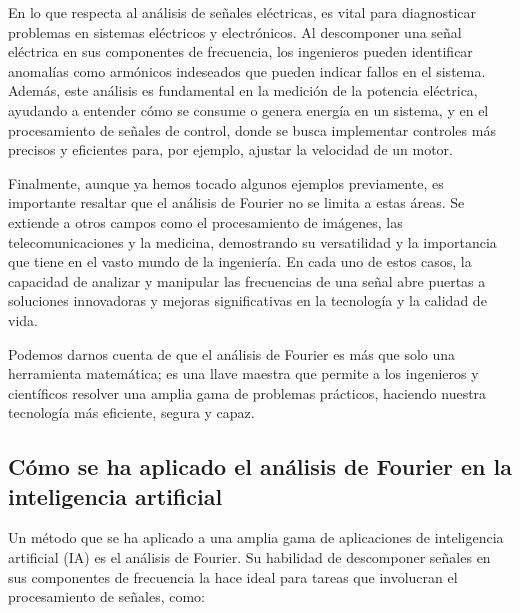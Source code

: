 En lo que respecta al análisis de señales eléctricas, es vital para diagnosticar problemas en sistemas eléctricos y electrónicos. Al descomponer una señal eléctrica en sus componentes de frecuencia, los ingenieros pueden identificar anomalías como armónicos indeseados que pueden indicar fallos en el sistema. Además, este análisis es fundamental en la medición de la potencia eléctrica, ayudando a entender cómo se consume o genera energía en un sistema, y en el procesamiento de señales de control, donde se busca implementar controles más precisos y eficientes para, por ejemplo, ajustar la velocidad de un motor.

Finalmente, aunque ya hemos tocado algunos ejemplos previamente, es importante resaltar que el análisis de Fourier no se limita a estas áreas. Se extiende a otros campos como el procesamiento de imágenes, las telecomunicaciones y la medicina, demostrando su versatilidad y la importancia que tiene en el vasto mundo de la ingeniería. En cada uno de estos casos, la capacidad de analizar y manipular las frecuencias de una señal abre puertas a soluciones innovadoras y mejoras significativas en la tecnología y la calidad de vida.

Podemos darnos cuenta de que el análisis de Fourier es más que solo una herramienta matemática; es una llave maestra que permite a los ingenieros y científicos resolver una amplia gama de problemas prácticos, haciendo nuestra tecnología más eficiente, segura y capaz.

\subsection{Cómo se ha aplicado el análisis de Fourier en la inteligencia artificial}

Un método que se ha aplicado a una amplia gama de aplicaciones de inteligencia artificial (IA) es el análisis de Fourier. Su habilidad de descomponer señales en sus componentes de frecuencia la hace ideal para tareas que involucran el procesamiento de señales, como:

